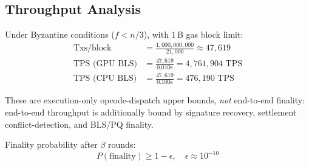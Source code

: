 \subsection{Throughput Analysis}

Under Byzantine conditions ($f < n/3$), with 1\,B gas block limit:
\begin{align}
\text{Txs/block} &= \frac{1{,}000{,}000{,}000}{21{,}000} \approx 47{,}619 \\
\text{TPS (GPU BLS)} &= \frac{47{,}619}{0.010\text{s}} = 4{,}761{,}904 \text{ TPS} \\
\text{TPS (CPU BLS)} &= \frac{47{,}619}{0.100\text{s}} = 476{,}190 \text{ TPS}
\end{align}

These are execution-only opcode-dispatch upper bounds, \emph{not} end-to-end finality:
end-to-end throughput is additionally bound by signature recovery, settlement
conflict-detection, and BLS/PQ finality.

Finality probability after $\beta$ rounds:
\begin{equation}
P(\text{finality}) \geq 1 - \epsilon, \quad \epsilon \approx 10^{-10}
\end{equation}

